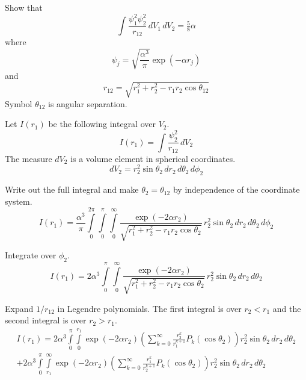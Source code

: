 \documentclass[12pt]{article}
\begin{document}
\noindent
Show that
\begin{equation*}
\int\frac{\psi_1^2\psi_2^2}{r_{12}}\,dV_1\,dV_2=\tfrac{5}{8}\alpha
\end{equation*}
where
\begin{equation*}
\psi_j=\sqrt{\frac{\alpha^3}{\pi}}\exp(-\alpha r_j)
\end{equation*}
and
\begin{equation*}
r_{12}=\sqrt{r_1^2+r_2^2-r_1r_2\cos\theta_{12}}
\end{equation*}
Symbol $\theta_{12}$ is angular separation.

\bigskip
\noindent
Let $I(r_1)$ be the following integral over $V_2$.
\begin{equation*}
I(r_1)=\int\frac{\psi_2^2}{r_{12}}\,dV_2
\end{equation*}
The measure $dV_2$ is a volume element in spherical coordinates.
\begin{equation*}
dV_2=r_2^2\sin\theta_2\,dr_2\,d\theta_2\,d\phi_2
\end{equation*}

\noindent
Write out the full integral and make $\theta_2=\theta_{12}$ by independence of the coordinate system.
\begin{equation*}
I(r_1)=\frac{\alpha^3}{\pi}
\int\limits_0^{2\pi}\int\limits_0^\pi\int\limits_0^\infty
\frac{\exp(-2\alpha r_2)}{\sqrt{r_1^2+r_2^2-r_1r_2\cos\theta_2}}
\,r_2^2\sin\theta_2\,dr_2\,d\theta_2\,d\phi_2
\end{equation*}

\noindent
Integrate over $\phi_2$.
\begin{equation*}
I(r_1)=
2\alpha^3\int\limits_0^\pi\int\limits_0^\infty
\frac{\exp(-2\alpha r_2)}{\sqrt{r_1^2+r_2^2-r_1r_2\cos\theta_2}}
\,r_2^2\sin\theta_2\,dr_2\,d\theta_2
\end{equation*}

\noindent
Expand $1/r_{12}$ in Legendre polynomials.
The first integral is over $r_2<r_1$ and the second integral is over $r_2>r_1$.
\begin{multline*}
I(r_1)=
2\alpha^3\int\limits_0^\pi\int\limits_0^{r_1}
\exp(-2\alpha r_2)
\left(\sum_{k=0}^\infty\frac{r_2^k}{r_1^{k+1}}P_k(\cos\theta_2)\right)
r_2^2\sin\theta_2\,dr_2\,d\theta_2
\\
+2\alpha^3\int\limits_0^\pi\int\limits_{r_1}^\infty
\exp(-2\alpha r_2)
\left(\sum_{k=0}^\infty\frac{r_1^k}{r_2^{k+1}}P_k(\cos\theta_2)\right)
r_2^2\sin\theta_2\,dr_2\,d\theta_2
\end{multline*}
\end{document}
